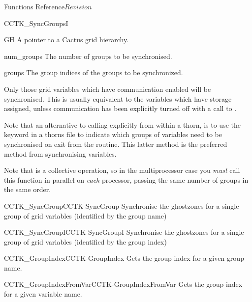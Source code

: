 \begin{cactuspart}{ Functions Reference}{}{$Revision$}
\begin{FunctionDescription}{CCTK\_SyncGroupsI}
\begin{ParameterSection}
\begin{Parameter}{GH}
A pointer to a Cactus grid hierarchy.
\end{Parameter}
\begin{Parameter}{num\_groups}
The number of groups to be synchronised.
\end{Parameter}
\begin{Parameter}{groups}
The group indices of the groups to be synchronized.
\end{Parameter}
\end{ParameterSection}

\begin{Discussion}
Only those grid variables which have communication enabled
will be synchronised. This is usually equivalent to the variables
which have storage assigned, unless communication has been explicitly
turned off with a call to .

Note that an alternative to calling  explicitly
from within a thorn, is to use the  keyword in a thorns
 file to indicate which groups of variables need
to be synchronised on exit from the routine. This latter method is
the preferred method from synchronising variables.

Note that  is a collective operation, so in the
multiprocessor case you {\em must\/} call this function in parallel on
{\em each\/} processor, passing the same number of groups in the same order.
\end{Discussion}

\begin{SeeAlsoSection}
\begin{SeeAlso2}{CCTK\_SyncGroup}{CCTK-SyncGroup}
Synchronise the ghostzones for a single group of grid variables
(identified by the group name)
\end{SeeAlso2}
\begin{SeeAlso2}{CCTK\_SyncGroupI}{CCTK-SyncGroupI}
Synchronise the ghostzones for a single group of grid variables
(identified by the group index)
\end{SeeAlso2}
\begin{SeeAlso2}{CCTK\_GroupIndex}{CCTK-GroupIndex}
Gets the group index for a given group name.
\end{SeeAlso2}
\begin{SeeAlso2}{CCTK\_GroupIndexFromVar}{CCTK-GroupIndexFromVar}
Gets the group index for a given variable name.
\end{SeeAlso2}
\end{SeeAlsoSection}


\end{FunctionDescription}
\end{cactuspart}
